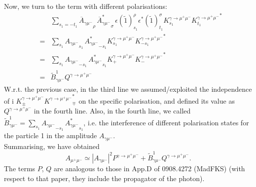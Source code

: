 \documentclass[a4paper,10pt]{article}
\begin{document}
Now, we turn to the term with different polarisations:
\begin{eqnarray}
   && \sum_{s_1=-t_1} {\overline A_{\gamma \mu^-} }_\rho\,  {\overline A^*_{\gamma \mu^-} }_\sigma 
    \, \epsilon(\tilde 1)^\rho_{s_1}  \epsilon^*(\tilde 1)^\sigma_{t_1} K^{\gamma\to\mu^+\mu^-}_{s_1} {K^{\gamma\to\mu^+\mu^-}_{t_1}}^*\\
    &=& \sum_{s_1}{A_{\gamma \mu^-} }_{s_1}\,  {A^*_{\gamma \mu^-} }_{-s_1}  K^{\gamma\to\mu^+\mu^-}_{s_1}  {K^{\gamma\to\mu^+\mu^-}_{-s_1}}^*\\
    &=&\sum_{s_1}{A_{\gamma \mu^-} }_{-s_1}\,  {A^*_{\gamma \mu^-} }_{s_1}  K^{\gamma\to\mu^+\mu^-}_{+}  {K^{\gamma\to\mu^+\mu^-}_{-}}^*\\
    &=& \tilde B^1_{\gamma \mu^-}  Q^{\gamma\to\mu^+\mu^-} 
\end{eqnarray}
W.r.t. the previous case, in the third line we assumed/exploited the independence of i
$K^{\gamma\to\mu^+\mu^-}_{\pm}  {K^{\gamma\to\mu^+\mu^-}}^*_{\mp}$ on the specific polarisation, and defined its value as
$Q^{\gamma\to\mu^+\mu^-} $ in the fourth line. Also, in the fourth line, we called 
$\tilde B^1_{\gamma \mu^-} = \sum_{s_1}{A_{\gamma \mu^-} }_{-s_1}\,  {A^*_{\gamma \mu^-} }_{s_1} $, i.e. the interference
of different polarisation states for the particle 1 in the amplitude $A_{\gamma \mu^-}$.\\
Summarising, we have obtained
\begin{equation}
  A_{\mu^+ \mu^-} \simeq  |A_{\gamma \mu^-} |^2 P^{\gamma\to\mu^+\mu^-}  +  \tilde B^1_{\gamma \mu^-}  Q^{\gamma\to\mu^+\mu^-}.
\end{equation}
The terms $P$, $Q$ are analogous to those in App.D of 0908.4272 (MadFKS) (with respect to that paper, they include the propagator of the photon). 
\end{document}
